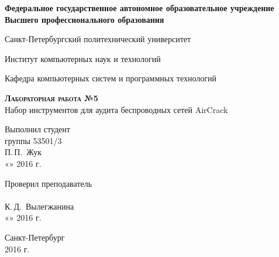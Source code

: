 \documentclass[10pt,a4paper,titlepage]{article}
\begin{document}
\begin{titlepage}
  \begin{center}
    \large
    \textbf{Федеральное государственное автономное образовательное учреждение\\
    Высшего профессионального образования}

    \vspace{0.25cm}

    Санкт-Петербургский политехнический университет
    \vspace{0.25cm}
    
    Институт компьютерных наук и технологий
    \vspace{0.25cm}
    
    Кафедра компьютерных систем и программных технологий
    \vfill

    \textbf{\textsc{Лабораторная работа №5}}\\[5mm]
    
    {\LARGE Набор инструментов для аудита беспроводных сетей AirCrack}
  \bigskip
    
\end{center}
\vfill

\newlength{\ML}
\hfill\begin{minipage}{0.4\textwidth}
  Выполнил студент\\ группы 53501/3\\
  \underline{\hspace{\ML}} П.\,П.~Жук\\
  «\underline{\hspace{0.7cm}}» \underline{\hspace{2cm}} 2016 г.
\end{minipage}%
\bigskip

\hfill\begin{minipage}{0.4\textwidth}
  Проверил преподаватель\\
  \underline{\hspace{\ML}}\\ К.\,Д.~Вылегжанина\\
  «\underline{\hspace{0.7cm}}» \underline{\hspace{2cm}} 2016 г.
\end{minipage}%
\vfill

\begin{center}
  Санкт-Петербург\\ 2016 г.
\end{center}
\end{titlepage}
\end{document}
